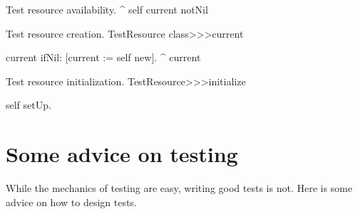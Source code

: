 \documentclass[a4paper,10pt,twoside]{book}
\begin{document}
{\begin{method}[testresourceisavailable]{Test resource availability.}
	^ self current notNil
\end{method}
\begin{method}[testresourcecurrent]{Test resource creation.}
TestResource class>>>current

	current ifNil: [current := self new].
	^ current
\end{method}
\begin{method}[restresourceinitialize]{Test resource initialization.}
TestResource>>>initialize

	self setUp.
\end{method}
\section{Some advice on testing}

While the mechanics of testing are easy, writing good tests is not.
Here is some advice on how to design tests.

\begin{description}



\end{description}}
\end{document}
